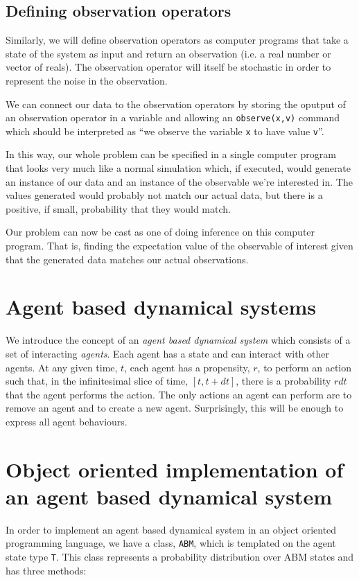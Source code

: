 \documentclass[letterpaper,twocolumn,10pt]{article}
\begin{document}
\subsection{Defining observation operators}
Similarly, we will define observation operators as computer programs that take a state of the system as input and return an observation (i.e. a real number or vector of reals). The observation operator will itself be stochastic in order to represent the noise in the observation.

We can connect our data to the observation operators by storing the oputput of an observation operator in a variable and allowing an \texttt{observe(x,v)} command which should be interpreted as ``we observe the variable \texttt{x} to have value \texttt{v}''.

In this way, our whole problem can be specified in a single computer program that looks very much like a normal simulation which, if executed, would generate an instance of our data and an instance of the observable we're interested in. The values generated would probably not match our actual data, but there is a positive, if small, probability that they would match.

Our problem can now be cast as one of doing inference on this computer program. That is, finding the expectation value of the observable of interest given that the generated data matches our actual observations.

\section{Agent based dynamical systems}
We introduce the concept of an \textit{agent based dynamical system} which consists of a set of interacting \textit{agents}. Each agent has a state and can interact with other agents. At any given time, $t$, each agent has a propensity, $r$, to perform an action such that, in the infinitesimal slice of time, $[t, t+dt]$, there is a probability $rdt$ that the agent performs the action. The only actions an agent can perform are to remove an agent and to create a new agent. Surprisingly, this will be enough to express all agent behaviours.

\section{Object oriented implementation of an agent based dynamical system}
In order to implement an agent based dynamical system in an object oriented programming language, we have a class, \texttt{ABM}, which is templated on the agent state type \texttt{T}. This class represents a probability distribution over ABM states and has three methods:
\end{document}
